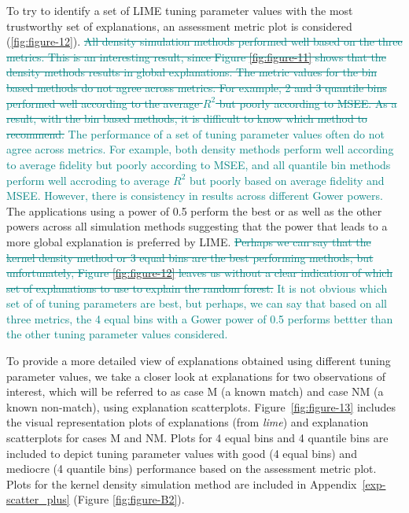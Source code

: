 \documentclass[AMS,STIX2COL]{WileyNJD-v2}\usepackage[]{graphicx}\usepackage[]{color}
\newcommand{\kge}[1]{\textcolor{teal}{#1}}
\begin{document}
To try to identify a set of LIME tuning parameter values with the most trustworthy set of explanations, an assessment metric plot is considered (\autoref{fig:figure-12}). \kge{\sout{All density simulation methods performed well based on the three metrics. This is an interesting result, since Figure \ref{fig:figure-11} shows that the density methods results in global explanations. The metric values for the bin based methods do not agree across metrics. For example, 2 and 3 quantile bins performed well according to the average $R^2$ but poorly according to MSEE. As a result, with the bin based methods, it is difficult to know which method to recommend.}} \kge{The performance of a set of tuning parameter values often do not agree across metrics. For example, both density methods perform well according to average fidelity but poorly according to MSEE, and all quantile bin methods perform well accroding to average $R^2$ but poorly based on average fidelity and MSEE. However, there is consistency in results across different Gower powers.} The applications using a power of 0.5 perform the best or as well as the other powers across all simulation methods suggesting that the power that leads to a more global explanation is preferred by LIME. \kge{\sout{Perhaps we can say that the kernel density method or 3 equal bins are the best performing methods, but unfortunately, Figure \ref{fig:figure-12} leaves us without a clear indication of which set of explanations to use to explain the random forest.}} \kge{It is not obvious which set of of tuning parameters are best, but perhaps, we can say that based on all three metrics, the 4 equal bins with a Gower power of 0.5 performs bettter than the other tuning parameter values considered.}

To provide a more detailed view of explanations obtained using different tuning parameter values, we take a closer look at explanations for two observations of interest, which will be referred to as case M (a known match) and case NM (a known non-match), using explanation scatterplots. Figure~\ref{fig:figure-13} includes the visual representation plots of explanations (from \emph{lime}) and explanation scatterplots for cases M and NM. Plots for 4 equal bins and 4 quantile bins are included to depict tuning parameter values with good (4 equal bins) and mediocre (4 quantile bins) performance based on the assessment metric plot. Plots for the kernel density simulation method are included in Appendix~\ref{exp-scatter_plus} (Figure \ref{fig:figure-B2}). 
\end{document}
